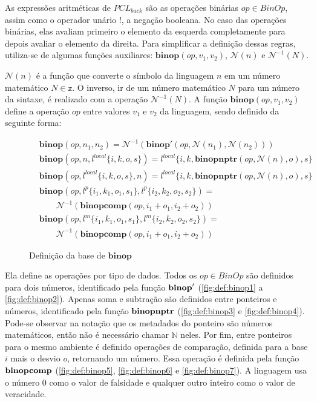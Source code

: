 As expressões aritméticas de $PCL_{back}$ são as operações binárias $op \in BinOp$, assim como o operador unário $!$, a negação booleana. No caso das operações binárias, elas avaliam primeiro o elemento da esquerda completamente para depois avaliar o elemento da direita. Para simplificar a definição dessas regras, utiliza-se de algumas funções auxiliares: $\mathbf{binop}(op, v_1, v_2)$, $\mathcal{N}(n)$ e $\mathcal{N}^{-1}(N)$. 

$\mathcal{N}(n)$ é a função que converte o símbolo da linguagem $n$ em um número matemático $N \in \mathbb{z}$. O inverso, ir de um número matemático $N$ para um número da sintaxe, é realizado com a operação $\mathcal{N}^{-1}(N)$. A função $\mathbf{binop}(op, v_1, v_2)$ define a operação $op$ entre valores $v_1$ e $v_2$ da linguagem, sendo definido da seguinte forma:

\begin{figure}[ht]
	\begin{align}
		& \mathbf{binop}(op, n_1, n_2) = \mathcal{N}^{-1}(\mathbf{binop}'(op, \mathcal{N}(n_1), \mathcal{N}(n_2))) \\
		& \mathbf{binop}(op, n, l^{local}\{i, k, o, s\}) = l^{local}\{i, k, \mathbf{binopnptr}(op, \mathcal{N}(n), o), s\} \\
		& \mathbf{binop}(op, l^{local}\{i, k, o, s\}, n) = l^{local}\{i, k, \mathbf{binopnptr}(op, \mathcal{N}(n), o), s\} \\
		& \mathbf{binop}(op, l^p\{i_1, k_1, o_1, s_1\}, l^p\{i_2, k_2, o_2, s_2\}) = \nonumber \\ 
		&\quad\quad\mathcal{N}^{-1}(\mathbf{binopcomp}(op, i_1 + o_1, i_2 + o_2)) \\
		& \mathbf{binop}(op, l^m\{i_1, k_1, o_1, s_1\}, l^m\{i_2, k_2, o_2, s_2\}) = \nonumber \\ 
		&\quad\quad\mathcal{N}^{-1}(\mathbf{binopcomp}(op, i_1 + o_1, i_2 + o_2)) 
	\end{align}
	\caption{Definição da base de $\mathbf{binop}$}
	\label{fig:def:binop:base}
\end{figure}

Ela define as operações por tipo de dados. Todos os $op \in BinOp$ são definidos para dois números, identificado pela função $\mathbf{binop}'$ (\ref{fig:def:binop1} a \ref{fig:def:binop2}). Apenas soma e subtração são definidos entre ponteiros e números, identificado pela função $\mathbf{binopnptr}$ (\ref{fig:def:binop3} e \ref{fig:def:binop4}). Pode-se observar na notação que os metadados do ponteiro são números matemáticos, então não é necessário chamar $\mathbb{N}$ neles. Por fim, entre ponteiros para o mesmo ambiente é definido operações de comparação, definida para a base $i$ mais o desvio $o$, retornando um número. Essa operação é definida pela função $\mathbf{binopcomp}$ (\ref{fig:def:binop5}, \ref{fig:def:binop6} e \ref{fig:def:binop7}). A linguagem usa o número 0 como o valor de falsidade e qualquer outro inteiro como o valor de veracidade.

